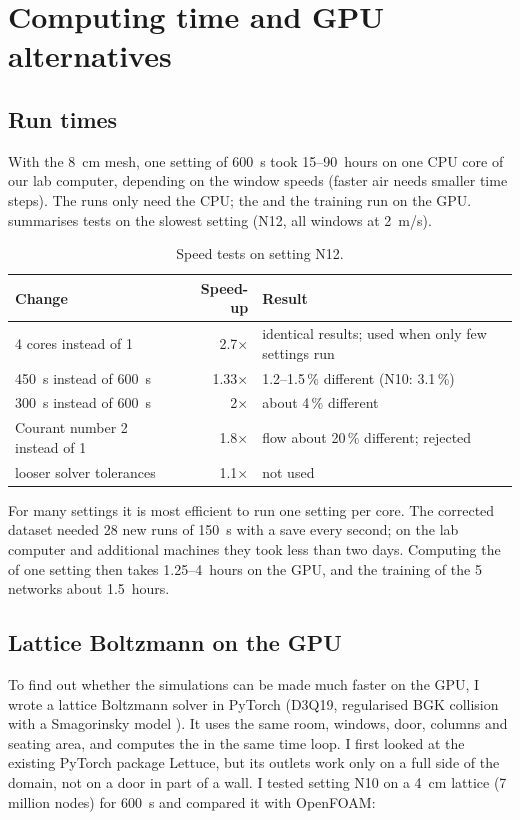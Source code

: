 \chapter{Computing time and GPU alternatives}
\label{ch:computation}

\section{Run times}
With the 8~cm mesh, one setting of 600~s took 15--90~hours on one CPU core of our lab computer, depending on
the window speeds (faster air needs smaller time steps). The runs only need the CPU; the \cotwo{} and the
training run on the GPU.  summarises tests on the slowest setting (N12, all windows at 2~m/s).

\begin{table}[h]
  \centering
  \caption{Speed tests on setting N12.}
  \label{tab:speed}
  \begin{tabular}{>{\raggedright}p{5cm}rp{6.3cm}}
    \toprule
    Change & Speed-up & Result\\
    \midrule
    4 cores instead of 1 & 2.7$\times$ & identical results; used when only few settings run\\
    450~s instead of 600~s & 1.33$\times$ & \cotwo{} 1.2--1.5\,\% different (N10: 3.1\,\%)\\
    300~s instead of 600~s & 2$\times$ & about 4\,\% different\\
    Courant number 2 instead of 1 & 1.8$\times$ & flow about 20\,\% different; rejected\\
    looser solver tolerances & 1.1$\times$ & not used\\
    \bottomrule
  \end{tabular}
\end{table}

For many settings it is most efficient to run one setting per core. The corrected dataset needed 28 new runs
of 150~s with a save every second; on the lab computer and additional machines they took less than two days.
Computing the \cotwo{} of one setting then takes 1.25--4~hours on the GPU, and the training of the 5 networks
about 1.5~hours.

\section{Lattice Boltzmann on the GPU}
To find out whether the simulations can be made much faster on the GPU, I wrote a lattice Boltzmann solver in
PyTorch (D3Q19, regularised BGK collision with a Smagorinsky model \citep{smagorinsky1963,kruger2017}). It uses
the same room, windows, door, columns and seating area, and computes the \cotwo{} in the same time loop. I first
looked at the existing PyTorch package Lettuce, but its outlets work only on a full side of the domain, not on a
door in part of a wall. I tested setting N10 on a 4~cm lattice (7 million nodes) for 600~s and compared it with
OpenFOAM:

